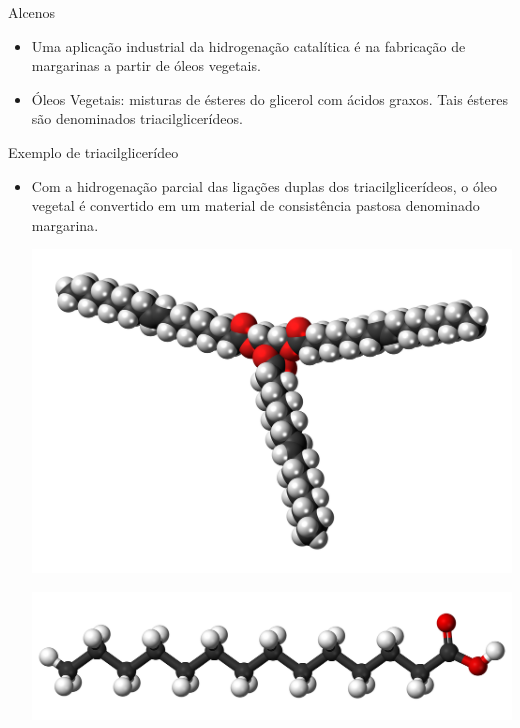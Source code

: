 \documentclass{beamer}
\begin{document}
\begin{frame}[label={sec:org7274512}]{Alcenos}
\begin{block}{}
\begin{itemize}
\item Uma aplicação industrial da hidrogenação catalítica é na fabricação de margarinas a partir de óleos vegetais.
\item Óleos Vegetais: misturas de ésteres do glicerol com ácidos graxos. Tais ésteres são denominados \alert{triacilglicerídeos}.
\end{itemize}


\begin{bclogo}[couleur=blue!30 , arrondi=0.1 , logo=\bcplume , epBarre=3.5]{Exemplo de triacilglicerídeo}
\end{bclogo}
\end{block}


\begin{block}{}
\begin{itemize}
\item Com a hidrogenação parcial das ligações duplas dos triacilglicerídeos, o óleo vegetal é convertido em um material de consistência pastosa denominado \alert{margarina}.

\begin{center}
\includegraphics[scale=0.05]{../ReacoesOrganicas/trigli3D.png}
\end{center} \par
\begin{center}
\includegraphics[scale=0.05]{../ReacoesOrganicas/triglimono.png}
\end{center}
\end{itemize}
\end{block}




\end{frame}
\end{document}
